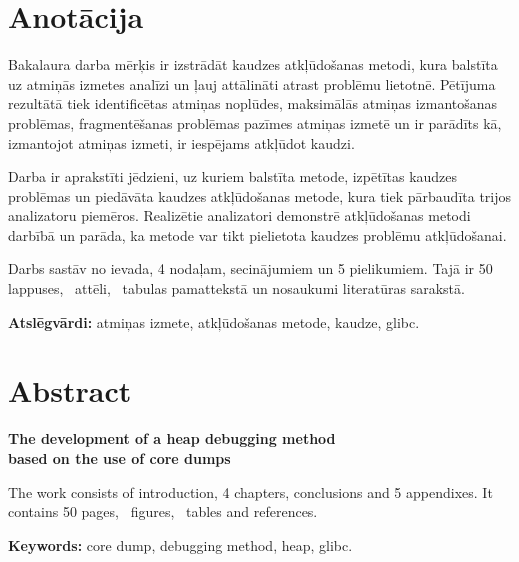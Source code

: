 \chapter*{Anotācija}
\thispagestyle{empty}

Bakalaura darba mērķis ir izstrādāt kaudzes atkļūdošanas metodi, kura balstīta uz atmiņās izmetes analīzi un ļauj attālināti atrast problēmu lietotnē.
Pētījuma rezultātā tiek identificētas atmiņas noplūdes, maksimālās atmiņas izmantošanas problēmas, fragmentēšanas problēmas pazīmes atmiņas izmetē un ir parādīts kā, izmantojot atmiņas izmeti, ir iespējams atkļūdot kaudzi.

Darba ir aprakstīti jēdzieni, uz kuriem balstīta metode, izpētītas kaudzes problēmas un piedāvāta kaudzes atkļūdošanas metode, kura tiek pārbaudīta trijos analizatoru piemēros.
Realizētie analizatori demonstrē atkļūdošanas metodi darbībā un parāda, ka metode var tikt pielietota kaudzes problēmu atkļūdošanai.

Darbs sastāv no ievada, 4 nodaļam, secinājumiem un 5 pielikumiem. Tajā ir 50 lappuses, \totfig\ attēli, \tottab\ tabulas pamattekstā un  nosaukumi literatūras sarakstā.

\textbf{Atslēgvārdi:} atmiņas izmete, atkļūdošanas metode, kaudze, glibc.

\newpage

\chapter*{Abstract}
\begin{center}
\linespread{1.2}
\vspace{-0.3cm}
\large \textbf {The development of a heap debugging method \protect\\  based on the use of core dumps}
\end{center}

\thispagestyle{empty}
	The work consists of introduction, 4 chapters, conclusions and 5 appendixes. It contains 50 pages, \totfig\ figures, \tottab\ tables and  references.

\textbf{Keywords:} core dump, debugging method, heap, glibc.


\newpage 